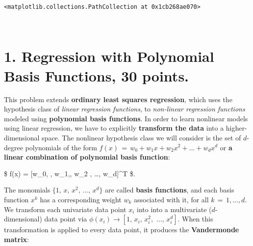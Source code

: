 \documentclass[11pt]{article}
\makeatletter
\newcommand{\boxspacing}{\kern\kvtcb@left@rule\kern\kvtcb@boxsep}
\newcommand{\prompt}[4]{
        {\ttfamily\llap{{\color{#2}[#3]:\hspace{3pt}#4}}\vspace{-\baselineskip}}
    }
\makeatother
\begin{document}
            \begin{tcolorbox}[breakable, size=fbox, boxrule=.5pt, pad at break*=1mm, opacityfill=0]
\prompt{Out}{outcolor}{4}{\boxspacing}
\begin{Verbatim}[commandchars=\\\{\}]
<matplotlib.collections.PathCollection at 0x1cb268ae070>
\end{Verbatim}
\end{tcolorbox}
        
    \begin{center}
    \end{center}
    { \hspace*{\fill} \\}
    
    \hypertarget{regression-with-polynomial-basis-functions-30-points.}{%
\section{\texorpdfstring{1. \textbf{Regression with Polynomial Basis
Functions}, 30
points.}{1.  Regression with Polynomial Basis Functions, 30 points.}}\label{regression-with-polynomial-basis-functions-30-points.}}

    This problem extends \textbf{ordinary least squares regression}, which
uses the hypothesis class of \emph{linear regression functions}, to
\emph{non-linear regression functions} modeled using \textbf{polynomial
basis functions}. In order to learn nonlinear models using linear
regression, we have to explicitly \textbf{transform the data} into a
higher-dimensional space. The nonlinear hypothesis class we will
consider is the set of \(d\)-degree polynomials of the form
\(f(x) \, = \, w_0 + w_1 x + w_2 x^2 + ... + w_d x^d\) or \textbf{a
linear combination of polynomial basis function}:

\$ f(x) = {[}w\_0, , w\_1,, w\_2 , \ldots, w\_d{]}\^{}T
\$.

The monomials \(\{ 1, \, x, \, x^2, \, ..., \, x^d\}\) are called
\textbf{basis functions}, and each basis function \(x^k\) has a
corresponding weight \(w_k\) associated with it, for all
\(k \, = \, 1, ..., d\). We transform each univariate data point \(x_i\)
into into a multivariate (\(d\)-dimensional) data point via
\(\phi(x_i) \rightarrow [1, \, x_i, \, x_i^2, \, \, ..., \, x^d_i]\).
When this transformation is applied to every data point, it produces the
\textbf{Vandermonde matrix}:
\end{document}
